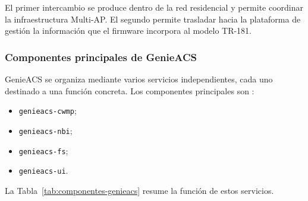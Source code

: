El primer intercambio se produce dentro de la red residencial y permite
coordinar la infraestructura Multi-AP. El segundo permite trasladar hacia
la plataforma de gestión la información que el firmware incorpora al
modelo TR-181.


\subsubsection*{Componentes principales de GenieACS}

GenieACS se organiza mediante varios servicios independientes, cada uno
destinado a una función concreta. Los componentes principales son
\cite{genieacs_documentation}:

\begin{itemize}
    \item \texttt{genieacs-cwmp};
    \item \texttt{genieacs-nbi};
    \item \texttt{genieacs-fs};
    \item \texttt{genieacs-ui}.
\end{itemize}

La Tabla~\ref{tab:componentes-genieacs} resume la función de estos
servicios.


